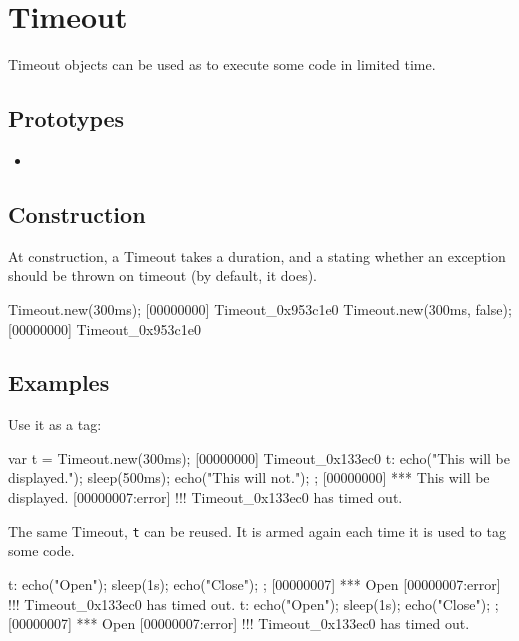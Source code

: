 
\section{Timeout}

Timeout objects can be used as  to execute some
code in limited time.

\subsection{Prototypes}
\begin{itemize}
\item {}
\end{itemize}

\subsection{Construction}
At construction, a Timeout takes a duration, and a 
stating whether an exception should be thrown on timeout (by default,
it does).

\begin{urbiscript}
Timeout.new(300ms);
[00000000] Timeout_0x953c1e0
Timeout.new(300ms, false);
[00000000] Timeout_0x953c1e0
\end{urbiscript}

\subsection{Examples}

Use it as a tag:

\begin{urbiscript}
var t = Timeout.new(300ms);
[00000000] Timeout_0x133ec0
t:{
  echo("This will be displayed.");
  sleep(500ms);
  echo("This will not.");
};
[00000000] *** This will be displayed.
[00000007:error] !!! Timeout_0x133ec0 has timed out.
\end{urbiscript}

The same Timeout, \lstinline|t| can be reused.  It is armed again each
time it is used to tag some code.

\begin{urbiscript}
t: { echo("Open"); sleep(1s); echo("Close"); };
[00000007] *** Open
[00000007:error] !!! Timeout_0x133ec0 has timed out.
t: { echo("Open"); sleep(1s); echo("Close"); };
[00000007] *** Open
[00000007:error] !!! Timeout_0x133ec0 has timed out.
\end{urbiscript}

